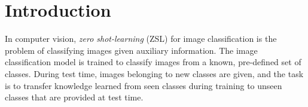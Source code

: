 \documentclass[11pt,a4paper]{article}
\newcommand\gal[1]{\textcolor{bright}{\textbf{GAL:} #1 }}
\begin{document}
\begin{abstract}
\end{abstract}




\section{Introduction}

In computer vision, {\em zero shot-learning} (ZSL) for image classification is the problem of classifying images given auxiliary information. The image classification model is trained to classify images from a known, pre-defined set of classes. During test time, images belonging to new classes are given, and the task is to transfer knowledge learned from seen classes during training to  unseen classes that are provided at test time. 
\end{document}
